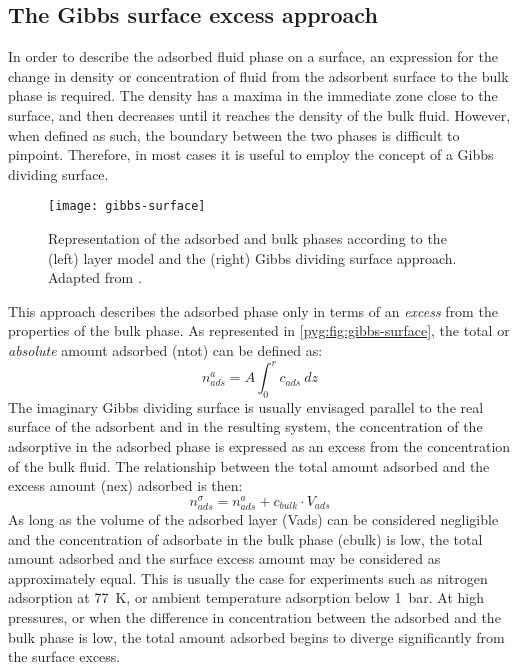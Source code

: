 \subsection{The Gibbs surface excess approach}\label{pyg:models:gibbs}

In order to describe the adsorbed fluid phase on a surface, 
an expression for the change in density or concentration of fluid
from the adsorbent surface to the bulk phase is required. The density
has a maxima in the immediate zone close to the surface, and then
decreases until it reaches the density of the bulk fluid.
However, when defined as such, the boundary between the
two phases is difficult to pinpoint.
Therefore, in most cases it is useful to employ the concept
of a Gibbs dividing surface.

\begin{figure}[htb]
	\centering
	\texttt{[image: gibbs-surface]}
	\caption{
		Representation of the adsorbed and bulk phases according to
		the (left) layer model and the (right) Gibbs dividing surface
		approach. Adapted from \citet{rouquerolAdsorptionPowdersPorous2013}.
	}\label{pyg:fig:gibbs-surface}
\end{figure}

This approach describes the adsorbed phase only in terms
of an \textit{excess} from the properties of the bulk phase.
As represented in \autoref{pyg:fig:gibbs-surface}, the total
or \textit{absolute} amount adsorbed (\gls{ntot}) can be defined as:
%
\begin{equation}
	n_{ads}^{a} = A \int_0^r c_{ads}\ dz
\end{equation}
%
The imaginary Gibbs dividing surface is usually envisaged parallel to
the real surface of the adsorbent and in the resulting system, the
concentration of the adsorptive in the adsorbed phase is
expressed as an excess from the concentration of the bulk fluid.
The relationship between the total amount adsorbed and the
excess amount (\gls{nex}) adsorbed is then:
%
\begin{equation}\label{pyg:eqn:total-excess}
	n_{ads}^{\sigma} = n_{ads}^{a} +  c_{bulk} \cdot V_{ads}
\end{equation}
%
As long as the volume of the adsorbed layer (\gls{Vads}) can be
considered negligible and the concentration of adsorbate in the bulk
phase (\gls{cbulk}) is low, the total amount adsorbed and the surface
excess amount may be considered as approximately equal.
This is usually the case for experiments such as nitrogen
adsorption at \SI{77}{\kelvin}, or ambient temperature adsorption
below \SI{1}{\bar}.
At high pressures, or when the difference in concentration between
the adsorbed and the bulk phase is low, the total amount adsorbed
begins to diverge significantly from the surface excess.

